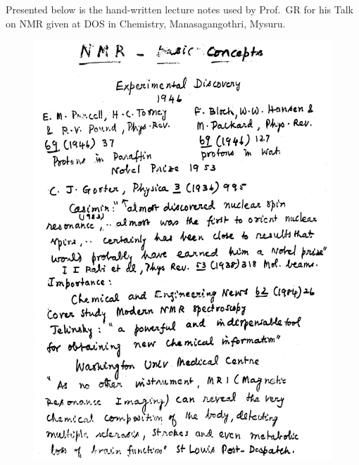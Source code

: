 Presented below is the hand-written lecture notes used by Prof.\ GR for his 
Talk on NMR given at DOS in Chemistry, Manasagangothri, Mysuru.

\begin{figure}[H]
\centering
\includegraphics[scale=0.6]{src/images/chap8/1.eps}
\end{figure}
